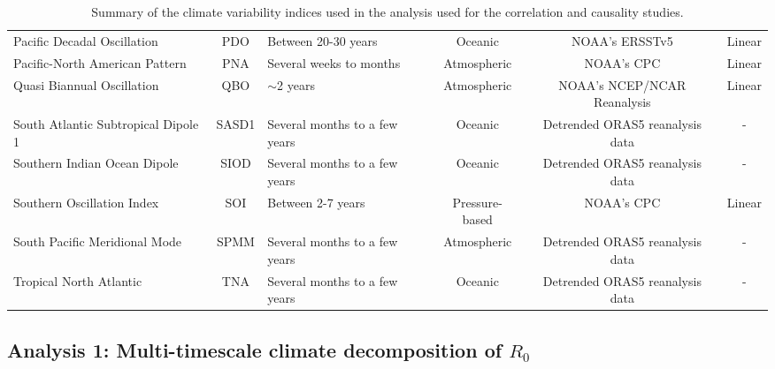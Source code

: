 \documentclass[
	a4paper, %
	8pt, %
	unnumberedsections, %
	twoside, %
]{LTJournalArticle}
\begin{document}
\begin{table*}[t]
{\begin{tabular}{l|c|l|c|c|c}
  Pacific Decadal Oscillation         & PDO                                        & Between 20-30 years           & Oceanic                                    & NOAA's ERSSTv5                         & Linear                     \\
  Pacific-North American Pattern      & PNA                                        & Several weeks to months       & Atmospheric                                & NOAA's CPC                             & Linear                     \\
  Quasi Biannual Oscillation          & QBO                                        & $\sim$2 years                 & Atmospheric                                & NOAA's NCEP/NCAR Reanalysis            & Linear                     \\
  South Atlantic Subtropical Dipole 1 & SASD1                                      & Several months to a few years & Oceanic                                    & Detrended ORAS5 reanalysis data        & -                          \\
  Southern Indian Ocean Dipole        & SIOD                                       & Several months to a few years & Oceanic                                    & Detrended ORAS5 reanalysis data        & -                          \\
  Southern Oscillation Index          & SOI                                        & Between 2-7 years             & Pressure-based                             & NOAA's CPC                             & Linear                     \\
  South Pacific Meridional Mode       & SPMM                                       & Several months to a few years & Atmospheric                                & Detrended ORAS5 reanalysis data        & -                          \\
  Tropical North Atlantic             & TNA                                        & Several months to a few years & Oceanic                                    & Detrended ORAS5 reanalysis data        & -                         
  \end{tabular}%
  }
  \caption{Summary of the climate variability indices used in the analysis used for the correlation and causality studies.}
  \label{tab:climate-variability-indices}
  \end{table*}
    
  \subsection{Analysis 1: Multi-timescale climate decomposition of $R_0$} \label{sec-methods-1-analysis}
\end{document}
